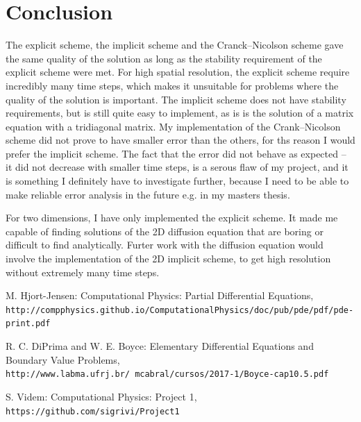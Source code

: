 \documentclass{article}
\begin{document}
\section{Conclusion}
The explicit scheme, the implicit scheme and the Cranck--Nicolson scheme gave the same quality of the solution as long as the stability requirement of the explicit scheme were met. For high spatial resolution, the explicit scheme require incredibly many time steps, which makes it unsuitable for problems where the quality of the solution is important. The implicit scheme does not have stability requirements, but is still quite easy to implement, as is is the solution of a matrix equation with a tridiagonal matrix. My implementation of the Crank--Nicolson scheme did not prove to have smaller error than the others, for ths reason I would prefer the implicit scheme. The fact that the error did not behave as expected -- it did not decrease with smaller time steps, is a serous flaw of my project, and it is something I definitely have to investigate further, because I need to be able to make reliable error analysis in the future e.g.  in my masters thesis.

For two dimensions, I have only implemented the explicit scheme. It made me capable of finding solutions of the 2D diffusion equation that are boring or difficult to find analytically. Furter work with the diffusion equation would involve the implementation of the 2D implicit scheme, to get high resolution without extremely many time steps. 

\begin{thebibliography}{1}

M. Hjort-Jensen: Computational Physics: Partial Differential Equations,
\\\texttt{http://compphysics.github.io/ComputationalPhysics/doc/pub/pde/pdf/pde-print.pdf}

R. C. DiPrima and W. E. Boyce: Elementary Differential Equations and Boundary Value Problems,
\\\texttt{http://www.labma.ufrj.br/~mcabral/cursos/2017-1/Boyce-cap10.5.pdf}

S. Videm: Computational Physics: Project 1,
\\\texttt{https://github.com/sigrivi/Project1}





\end{thebibliography}
\end{document}
